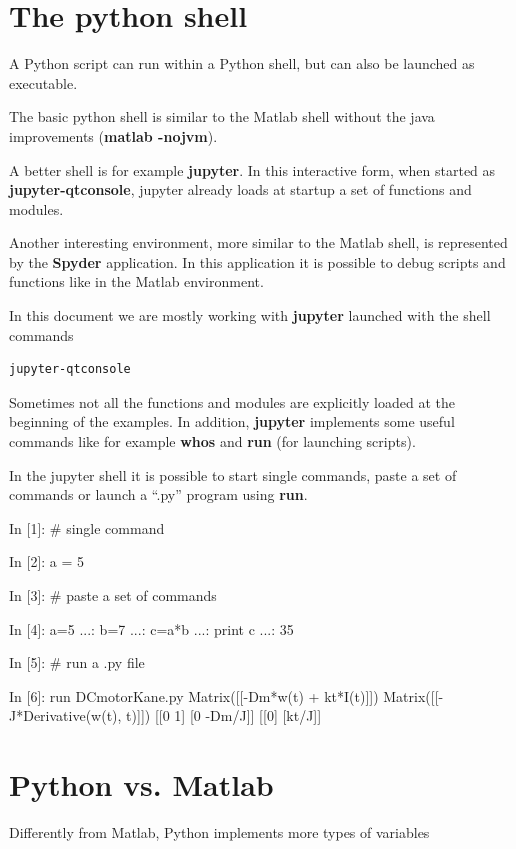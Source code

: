 \section{The python shell}
A Python script can run within a Python shell, but can also be launched as
executable.

The basic python shell is similar to the Matlab shell without the java 
improvements (\textbf{matlab -nojvm}).

A better shell is for example \textbf{jupyter}. In this interactive form, when 
started as \textbf{jupyter-qtconsole}, jupyter already loads at startup 
a set of functions and modules. 

Another interesting environment, more similar to the Matlab shell, is 
represented by the \textbf{Spyder} application. In this application it is 
possible to debug scripts and functions like in the Matlab environment.

In this document we are mostly working with \textbf{jupyter} launched with the 
shell 
commands

\begin{verbatim}
jupyter-qtconsole
\end{verbatim}

Sometimes not all the functions and modules are explicitly loaded at the 
beginning of the examples. In addition, \textbf{jupyter} implements some useful 
commands like for example \textbf{whos} and \textbf{run} (for launching 
scripts).

In the jupyter shell it is possible to start single commands, paste a set of 
commands or launch a ``.py'' program using \textbf{run}.

\begin{code}
In [1]: # single command

In [2]: a = 5

In [3]: # paste a set of commands

In [4]: a=5
   ...: b=7
   ...: c=a*b
   ...: print c
   ...: 
35

In [5]: # run a .py file

In [6]: run DCmotorKane.py
Matrix([[-Dm*w(t) + kt*I(t)]])
Matrix([[-J*Derivative(w(t), t)]])
[[0 1]
 [0 -Dm/J]]
[[0]
 [kt/J]]
\end{code}

\section{Python vs. Matlab}

Differently from Matlab, Python implements more types of variables

